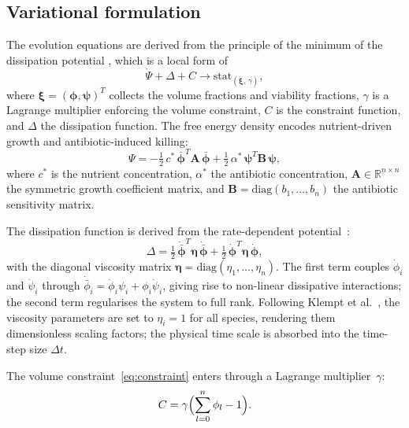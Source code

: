 \documentclass[pdflatex,sn-mathphys-num,lineno]{sn-jnl}
\newcommand{\bphi}{\boldsymbol{\phi}}
\newcommand{\bpsi}{\boldsymbol{\psi}}
\newcommand{\Real}{\mathbb{R}}
\begin{document}
\subsection{Variational formulation}
The evolution equations are derived from the principle of the minimum of the dissipation potential \cite{junker2014principle, hackl1997generalized}, which is a local form of
\begin{equation}
    \dot{\Psi} + \Delta + C \rightarrow \mathrm{stat}_{(\dot{\boldsymbol{\xi}}, \, \gamma)},
    \label{eq:variational_local}
\end{equation}
where $\boldsymbol{\xi} = (\boldsymbol{\phi}, \boldsymbol{\psi})^T$ collects the volume fractions and viability fractions, $\gamma$ is a Lagrange multiplier enforcing the volume constraint, $C$ is the constraint function, and $\Delta$ the dissipation function. The free energy density encodes nutrient-driven growth and antibiotic-induced killing:
\begin{equation}
\Psi = -\tfrac{1}{2}\,c^*\,\bar{\bphi}^T \mathbf{A}\,\bar{\bphi}
      + \tfrac{1}{2}\,\alpha^*\,\bpsi^T \mathbf{B}\,\bpsi,
\label{eq:psi}
\end{equation}
where $c^*$ is the nutrient concentration, $\alpha^*$ the antibiotic concentration, $\mathbf{A}\in\Real^{n\times n}$ the symmetric growth coefficient matrix, and $\mathbf{B}=\mathrm{diag}(b_1,\dots,b_n)$ the antibiotic sensitivity matrix.

The dissipation function is derived from the rate-dependent potential~\cite{Klempt2025ContinuumBiofilm}:
\begin{equation}
\Delta = \tfrac{1}{2}\,\dot{\bar{\bphi}}^T\boldsymbol{\eta}\,\dot{\bar{\bphi}}
          + \tfrac{1}{2}\,\dot{\bphi}^T\boldsymbol{\eta}\,\dot{\bphi},
\label{eq:dissipation}
\end{equation}
with the diagonal viscosity matrix $\boldsymbol{\eta}=\mathrm{diag}(\eta_1,\dots,\eta_n)$. The first term couples $\dot\phi_i$ and $\dot\psi_i$ through $\dot{\bar\phi}_i = \dot\phi_i\psi_i + \phi_i\dot\psi_i$, giving rise to non-linear dissipative interactions; the second term regularises the system to full rank. Following Klempt et al.~\cite{Klempt2025ContinuumBiofilm}, the viscosity parameters are set to $\eta_i=1$ for all species, rendering them dimensionless scaling factors; the physical time scale is absorbed into the time-step size $\Delta t$.

The volume constraint~\eqref{eq:constraint} enters through a Lagrange multiplier~$\gamma$:
\begin{equation}
C = \gamma\Bigl(\sum_{l=0}^{n}\phi_l - 1\Bigr).
\label{eq:cfunc}
\end{equation}
\end{document}
